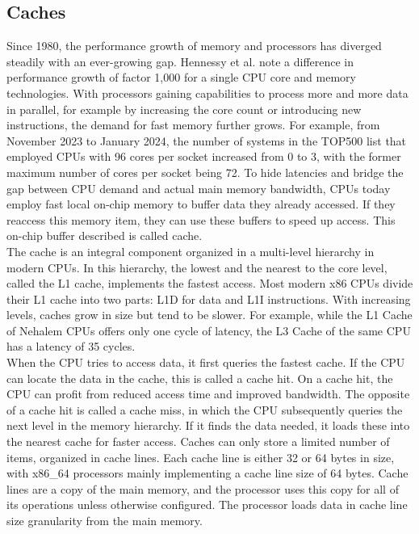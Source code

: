 \subsection{Caches}
\label{sec:state:technical:caches}
Since 1980, the performance growth of memory and processors has diverged
steadily with an ever-growing gap. Hennessy et al. note a difference in
performance growth of factor 1,000 for a single CPU core and memory
technologies.\cite{hennessy2011computer} With processors gaining capabilities to
process more and more data in parallel, for example by increasing the core count
or introducing new instructions, the demand for fast memory further grows. For
example, from November 2023 to January 2024, the number of systems in the TOP500
list that employed CPUs with 96 cores per socket increased from 0 to 3, with the
former maximum number of cores per socket being 72.\cite{top500} To hide
latencies and bridge the gap between CPU demand and actual main memory
bandwidth, CPUs today employ fast local on-chip memory to buffer data they
already accessed. If they reaccess this memory item, they can use these buffers
to speed up access. This on-chip buffer described is called cache.\\

The cache is an integral component organized in a multi-level hierarchy in
modern CPUs. In this hierarchy, the lowest and the nearest to the core level,
called the L1 cache, implements the fastest access. Most modern x86 CPUs divide
their L1 cache into two parts: L1D for data and L1I instructions. With
increasing levels, caches grow in size but tend to be slower. For example, while
the L1 Cache of Nehalem CPUs offers only one cycle of latency, the L3 Cache of
the same CPU has a latency of 35 cycles.\cite{hennessy2011computer}\\

When the CPU tries to access data, it first queries the fastest cache. If the
CPU can locate the data in the cache, this is called a cache hit. On a cache
hit, the CPU can profit from reduced access time and improved bandwidth. The
opposite of a cache hit is called a cache miss, in which the CPU subsequently
queries the next level in the memory hierarchy. If it finds the data needed, it
loads these into the nearest cache for faster access. Caches can only store a
limited number of items, organized in cache lines. Each cache line is either 32
or 64 bytes in size, with x86\_64 processors mainly implementing a cache line size
of 64 bytes. Cache lines are a copy of the main memory, and the processor uses
this copy for all of its operations unless otherwise configured. The processor
loads data in cache line size granularity from the main memory. \\

